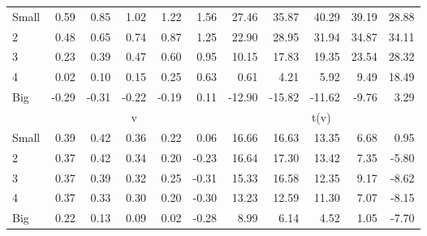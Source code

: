 \begin{table}[!ht]
\begin{tabular}{lrrrrrrrrrr}
    \\
      \cmidrule(r){2-6} \cmidrule(r){7-11}

    Small   & 0.59  & 0.85  & 1.02  & 1.22  & 1.56  & 27.46  & 35.87  & 40.29  & 39.19  & 28.88  \\
         2  & 0.48  & 0.65  & 0.74  & 0.87  & 1.25  & 22.90  & 28.95  & 31.94  & 34.87  & 34.11  \\
         3  & 0.23  & 0.39  & 0.47  & 0.60  & 0.95  & 10.15  & 17.83  & 19.35  & 23.54  & 28.32  \\
         4  & 0.02  & 0.10  & 0.15  & 0.25  & 0.63  & 0.61  & 4.21  & 5.92  & 9.49  & 18.49  \\
    Big     & -0.29  & -0.31  & -0.22  & -0.19  & 0.11  & -12.90  & -15.82  & -11.62  & -9.76  & 3.29  \\

  
    
      & \multicolumn{5}{c}{v} & \multicolumn{5}{c}{t(v)}
    
    \\
      \cmidrule(r){2-6} \cmidrule(r){7-11}

    Small   & 0.39  & 0.42  & 0.36  & 0.22  & 0.06  & 16.66  & 16.63  & 13.35  & 6.68  & 0.95  \\
         2  & 0.37  & 0.42  & 0.34  & 0.20  & -0.23  & 16.64  & 17.30  & 13.42  & 7.35  & -5.80  \\
         3  & 0.37  & 0.39  & 0.32  & 0.25  & -0.31  & 15.33  & 16.58  & 12.35  & 9.17  & -8.62  \\
         4  & 0.37  & 0.33  & 0.30  & 0.20  & -0.30  & 13.23  & 12.59  & 11.30  & 7.07  & -8.15  \\
    Big     & 0.22  & 0.13  & 0.09  & 0.02  & -0.28  & 8.99  & 6.14  & 4.52  & 1.05  & -7.70  \\

  

  \bottomrule
\end{tabular}
\label{tbl:25_Size_Var_F93}
\end{table}